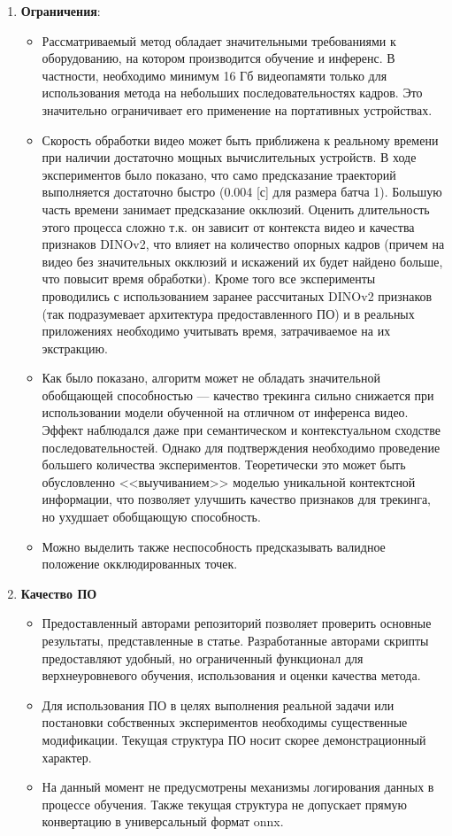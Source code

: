 \documentclass[a4paper, 14pt]{extarticle}
\theoremstyle{definition}
\theoremstyle{plain}
\theoremstyle{remark}
\begin{document}
\begin{enumerate}
    \item \textbf{Ограничения}:
    \begin{itemize}
        \item Рассматриваемый метод обладает значительными требованиями к оборудованию, на котором производится обучение и инференс. В частности, необходимо минимум 16 Гб видеопамяти только для использования метода на небольших последовательностях кадров. Это значительно ограничивает его применение на портативных устройствах.
        \item Скорость обработки видео может быть приближена к реальному времени при наличии достаточно мощных вычислительных устройств. В ходе экспериментов было показано, что само предсказание траекторий выполняется достаточно быстро (0.004 [с] для размера батча 1). Большую часть времени занимает предсказание окклюзий. Оценить длительность этого процесса сложно т.к. он зависит от контекста видео и качества признаков DINOv2, что влияет на количество опорных кадров (причем на видео без значительных окклюзий и искажений их будет найдено больше, что повысит время обработки). Кроме того все эксперименты проводились с использованием заранее рассчитаных DINOv2 признаков (так подразумевает архитектура предоставленного ПО) и в реальных приложениях необходимо учитывать время, затрачиваемое на их экстракцию.
        \item Как было показано, алгоритм может не обладать значительной обобщающей способностью --- качество трекинга сильно снижается при использовании модели обученной на отличном от инференса видео. Эффект наблюдался даже при семантическом и контекстуальном сходстве последовательностей. Однако для подтверждения необходимо проведение большего количества экспериментов. Теоретически это может быть обусловленно <<выучиванием>> моделью уникальной контектсной информации, что позволяет улучшить качество признаков для трекинга, но ухудшает обобщающую способность.
        \item Можно выделить также неспособность предсказывать валидное положение окклюдированных точек.
    \end{itemize}

    \item \textbf{Качество ПО}
    \begin{itemize}
        \item Предоставленный авторами репозиторий позволяет проверить основные результаты, представленные в статье. Разработанные авторами скрипты предоставляют удобный, но ограниченный функционал для верхнеуровневого обучения, использования и оценки качества метода.
        \item Для использования ПО в целях выполнения реальной задачи или постановки собственных экспериментов необходимы существенные модификации. Текущая структура ПО носит скорее демонстрационный характер.
        \item На данный момент не предусмотрены механизмы логирования данных в процессе обучения. Также текущая структура не допускает прямую конвертацию в универсальный формат onnx.
    \end{itemize}


\end{enumerate}
\end{document}
